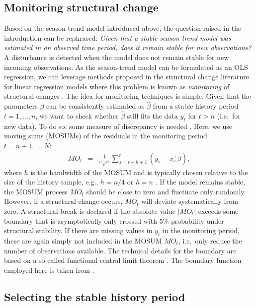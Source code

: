 \documentclass[authoryear,preprint,review,10pt]{elsarticle}
\begin{document}
\subsection{Monitoring structural change}\label{sec:MonStrucChange}

Based on the season-trend model introduced above, the question raised in
the introduction can be rephrased: \emph{Given that a stable season-trend model was estimated in an observed
time period, does it remain stable for new observations?} A disturbance is detected when the model does not remain stable for new incoming observations.
As the season-trend model can be formulated as an OLS regression,
we can leverage methods proposed in the structural change literature
for linear regression models where this problem is known as \emph{monitoring}
of structural changes \citep{Chu1996}.
The idea for monitoring techniques is simple. Given that the parameters
$\beta$ can be consistently estimated as $\hat \beta$ from a stable history
period $t = 1, \dots, n$, we want to check whether $\hat \beta$ still fits
the data $y_t$ for $t > n$ (i.e.\ for new data). To do so, some measure of discrepancy is needed \citep[][]{Chu1996, Leisch2000, Zeileis2005a}. Here, we use moving sums (MOSUMs) of the residuals in the monitoring
period $t = n + 1, \dots, N$:
%
\begin{eqnarray}
  MO_t & = & \frac{1}{\hat \sigma \sqrt{n}} \sum_{s = t - h + 1}^t (y_s - x_s^\top \hat \beta),
\end{eqnarray}
%
where $h$ is the bandwidth of the MOSUM and is typically chosen relative to
the size of the history sample, e.g., $h = n/4$ or $h = n$ \citep{Zeileis2005a, Zeileis:2010tt}.
If the model remains stable, the MOSUM process $MO_t$ should be close to zero and
fluctuate only randomly. However, if a structural change occurs, $MO_t$ will deviate
systematically from zero. A structural break is declared if the absolute value
$|MO_t|$ exceeds some boundary that is asymptotically only crossed with 5\%
probability under structural stability. 
If there are missing values in $y_t$ in the monitoring period, these are 
again simply not included in the MOSUM $MO_t$, i.e.\ only reduce the number 
of observations available. The technical details for the boundary are based
on a so called functional central limit theorem \citep[see][for details]{Leisch2000}.
The boundary function employed here is taken from \citet[Eq.~7]{Zeileis2005b}.

\subsection{Selecting the stable history period}\label{sec:StableHist}
\end{document}
